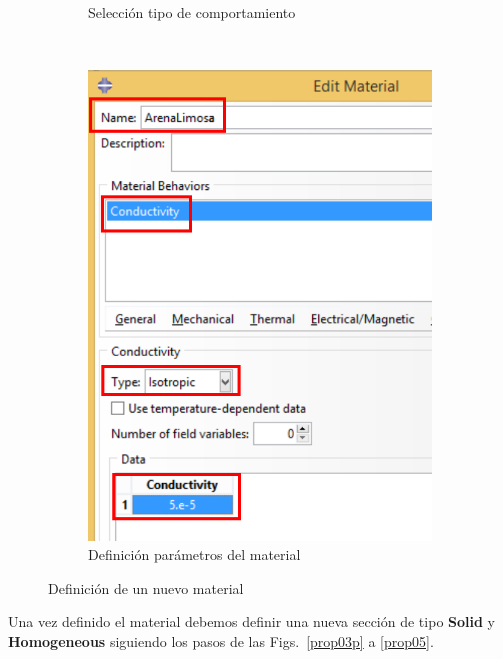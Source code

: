 \begin{figure}
\begin{subfigure}[!h]{0.36\textwidth}
      \caption{Selección tipo de comportamiento}
      \label{prop02}
    \end{subfigure}%
    ~
    \begin{subfigure}[!h]{0.36\textwidth}
      \includegraphics[width=\textwidth]{./body/images/prop03.pdf}
      \caption{Definición parámetros del material}
      \label{prop03}
    \end{subfigure}%
    \caption{Definición de un nuevo material}
  \end{figure}

  Una vez definido el material debemos definir una nueva sección de
  tipo \textbf{Solid} y \textbf{Homogeneous} siguiendo los pasos de
  las Figs.~\ref{prop03p} a \ref{prop05}.

